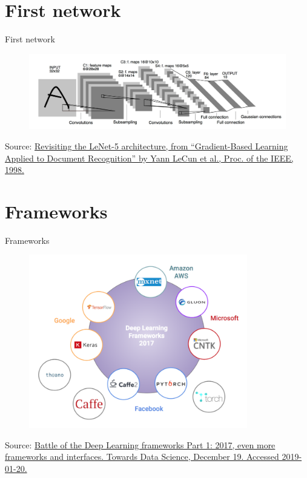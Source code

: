 \documentclass{beamer}
\begin{document}
\section{First network}
\begin{frame}{First network}
  \begin{figure}[h]
    \includegraphics[width=1\textwidth]{images/lenet.png}
  \end{figure}
  \footnotesize Source: \href{https://blog.insightdatascience.com/convolutional-neural-networks-explained-with-american-ninja-warrior-c6649875861c}{Revisiting the LeNet-5 architecture, from “Gradient-Based Learning Applied to Document Recognition” by Yann LeCun et al., Proc. of the IEEE, 1998.}
\end{frame}

\section{Frameworks}
\begin{frame}{Frameworks}
  \begin{figure}[h]
    \includegraphics[width=0.85\textwidth]{images/frameworks.png}
  \end{figure}
  \footnotesize Source: \href{https://devopedia.org/deep-learning-frameworks}{Battle of the Deep Learning frameworks Part 1: 2017, even more frameworks and interfaces. Towards Data Science, December 19. Accessed 2019-01-20.}
\end{frame}
\end{document}
